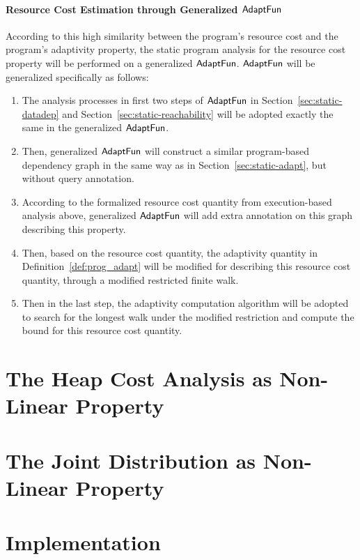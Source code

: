 \paragraph*{Resource Cost Estimation through Generalized $\textsf{AdaptFun}$}
According to this high similarity between the program's resource cost and the 
program's adaptivity property, the static program analysis for the resource cost property will 
be performed on a generalized  $\textsf{AdaptFun}$.  $\textsf{AdaptFun}$ will be generalized specifically as follows:
\begin{enumerate}
    \item The analysis processes in first two steps of $\textsf{AdaptFun}$ in Section~\ref{sec:static-datadep}
    and Section~\ref{sec:static-reachability} will be adopted exactly the same in the generalized $\textsf{AdaptFun}$.
    \item Then, generalized $\textsf{AdaptFun}$ will construct a similar program-based dependency graph 
    in the same way as in Section~\ref*{sec:static-adapt}, but without query annotation. 
    \item According to the formalized resource cost quantity from execution-based analysis above,
    generalized $\textsf{AdaptFun}$ will add extra annotation on this graph describing this property.
    \item Then, based on the resource cost quantity, the adaptivity quantity in Definition~\ref{def:prog_adapt}
    will be modified for describing this resource cost quantity, through a modified restricted finite walk.
    \item Then in the last step, the adaptivity computation algorithm will be adopted to search for the longest 
    walk under the modified restriction and compute the bound for 
    this resource cost quantity.
\end{enumerate}

\section{The Heap Cost Analysis as Non-Linear Property}
\label{sec:generalcost-example}


\section{The Joint Distribution as Non-Linear Property}
\label{sec:generalcost-example}


\section{Implementation}
\label{sec:generalcost-implementation}


